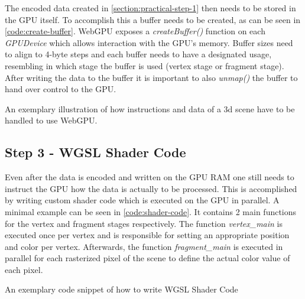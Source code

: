 The encoded data created in \ref*{section:practical-step-1} then needs to be stored in the GPU itself. To accomplish this a buffer needs to be created, as can be seen in \ref*{code:create-buffer}. 
WebGPU exposes a \emph{createBuffer()} function on each \emph{GPUDevice} which allows interaction with the GPU's memory. Buffer sizes need to align to 4-byte steps and each buffer needs to 
have a designated usage, resembling in which stage the buffer is used (vertex stage or fragment stage). After writing the data to the buffer it is important to also \emph{unmap()} the buffer 
to hand over control to the GPU. 

\begin{listing}
  \centering

  \caption[Code Snippet: createBuffer]
  {
    An exemplary illustration of how instructions and data of a 3d scene have to be handled
    to use WebGPU.
  }
  \label{code:create-buffer}
\end{listing}


\subsection{Step 3 - WGSL Shader Code}
\label{section:shader-code}

Even after the data is encoded and written on the GPU RAM one still needs to instruct the GPU how the data is actually to be processed. This is accomplished by writing custom
shader code which is executed on the GPU in parallel. A minimal example can be seen in \ref*{code:shader-code}.  It contains 2 main functions for the vertex and fragment stages respectively. 
The function \emph{vertex\_main} is executed once per vertex and is responsible for setting an appropriate position and color per vertex. Afterwards, the function \emph{fragment\_main} is 
executed in parallel for each rasterized pixel of the scene to define the actual color value of each pixel. 

\begin{listing}

  \centering

  \caption[Code Snippet: WebGPU Shader Code]
  {
    An exemplary code snippet of how to write WGSL Shader Code
  }
  \label{code:shader-code}
\end{listing}

